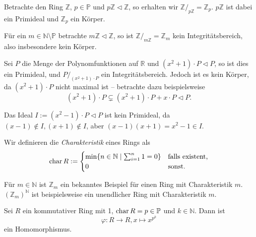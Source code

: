 
\begin{example}
    Betrachte den Ring $\mathbb{Z}$, $p \in \mathbb{P}$ und $p \mathbb{Z} \vartriangleleft \mathbb{Z}$, so erhalten wir $\mathbb{Z}/_{p\mathbb{Z}} = \mathbb{Z}_p$.
    $p\mathbb{Z}$ ist dabei ein Primideal und $\mathbb{Z}_p$ ein Körper.

    Für ein $m \in \mathbb{N}\setminus\mathbb{P}$ betrachte $m \mathbb{Z} \vartriangleleft \mathbb{Z}$, so ist $\mathbb{Z} /_{m\mathbb{Z}} = \mathbb{Z}_m$ kein Integritätsbereich,
    also insbesondere kein Körper.
\end{example}

\begin{example}
    Sei $P$ die Menge der Polynomfunktionen auf $\mathbb{R}$ und $(x^2+1) \cdot P \vartriangleleft P$, so ist dies ein Primideal, und $P/_{(x^2+1) \cdot P}$ ein Integritätsbereich. Jedoch ist es kein Körper, da $(x^2+1) \cdot P$ nicht maximal ist -- betrachte dazu beispielsweise
    $$ (x^2 + 1) \cdot P \subsetneq (x^2+1) \cdot P + x \cdot P \vartriangleleft P .$$

    Das Ideal $I := (x^2 - 1) \cdot P \vartriangleleft P$ ist kein Primideal, da $(x-1)\notin I, (x+1) \notin I$, aber $(x-1)(x+1) = x^2 - 1 \in I$.
\end{example}

\begin{definition}
    Wir definieren die \emph{Charakteristik} eines Rings als
    $$ \operatorname{char} R := 
    \begin{cases}
        \min\{n\in\mathbb{N}\mid\sum_{i=1}^n 1=0\} & \text{falls existent,}\\
        0 & \text{sonst}.
    \end{cases}
        $$
\end{definition}

\begin{example}
    Für $m\in\mathbb{N}$ ist $\mathbb{Z}_m$ ein bekanntes Beispiel für einen Ring mit Charakteristik $m$.
    $(\mathbb{Z}_m)^{\mathbb{N}}$ ist beispielsweise ein unendlicher Ring mit Charakteristik $m$.
\end{example}

\begin{proposition}\label{prop:frob_ringhomom}
    Sei $R$ ein kommutativer Ring mit 1, $\operatorname{char} R = p \in \mathbb{P}$ und $k\in\mathbb{N}$. Dann ist
    $$ \varphi : R \to R, x \mapsto x^{p^k} $$
    ein Homomorphismus.
\end{proposition}

